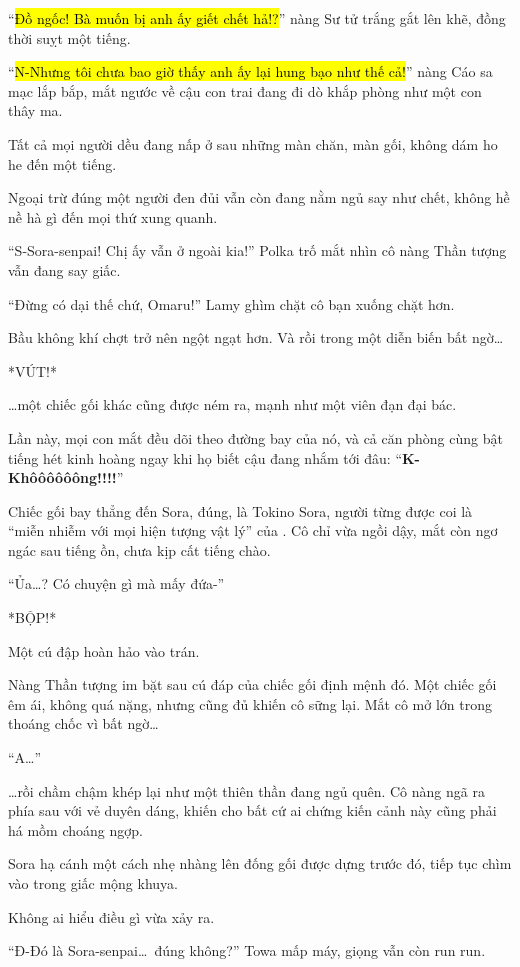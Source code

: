 \documentclass[../main.tex]{subfiles}
\begin{document}
``\hl{Đồ ngốc! Bà muốn bị anh ấy giết chết hả!?}'' nàng Sư tử trắng gắt lên khẽ, đồng thời suỵt một tiếng.

``\hl{N-Nhưng tôi chưa bao giờ thấy anh ấy lại hung bạo như thế cả!}'' nàng Cáo sa mạc lắp bắp, mắt ngước về cậu con trai đang đi dò khắp phòng như một con thây ma.

Tất cả mọi người dều đang nấp ở sau những màn chăn, màn gối, không dám ho he đến một tiếng.

Ngoại trừ đúng một người đen đủi vẫn còn đang nằm ngủ say như chết, không hề nề hà gì đến mọi thứ xung quanh.

``S-Sora-senpai! Chị ấy vẫn ở ngoài kia!'' Polka trố mắt nhìn cô nàng Thần tượng vẫn đang say giấc.

``Đừng có dại thế chứ, Omaru!'' Lamy ghìm chặt cô bạn xuống chặt hơn.

Bầu không khí chợt trở nên ngột ngạt hơn. Và rồi trong một diễn biến bất ngờ\dots

*VÚT!*

\dots một chiếc gối khác cũng được ném ra, mạnh như một viên đạn đại bác.

Lần này, mọi con mắt đều dõi theo đường bay của nó, và cả căn phòng cùng bật tiếng hét kinh hoàng ngay khi họ biết cậu đang nhắm tới đâu: ``\textbf{K-Khôôôôôông!!!!}''

Chiếc gối bay thẳng đến Sora, đúng, là Tokino Sora, người từng được coi là ``miễn nhiễm với mọi hiện tượng vật lý'' của \hll. Cô chỉ vừa ngồi dậy, mắt còn ngơ ngác sau tiếng ồn, chưa kịp cất tiếng chào.

``Ủa\dots? Có chuyện gì mà mấy đứa-''

*BỘP!*

Một cú đập hoàn hảo vào trán.

Nàng Thần tượng im bặt sau cú đáp của chiếc gối định mệnh đó. Một chiếc gối êm ái, không quá nặng, nhưng cũng đủ khiến cô sững lại. Mắt cô mở lớn trong thoáng chốc vì bất ngờ\dots

``A\dots''

\dots rồi chầm chậm khép lại như một thiên thần đang ngủ quên. Cô nàng ngã ra phía sau với vẻ duyên dáng, khiến cho bất cứ ai chứng kiến cảnh này cũng phải há mồm choáng ngợp.

Sora hạ cánh một cách nhẹ nhàng lên đống gối được dựng trước đó, tiếp tục chìm vào trong giấc mộng khuya.

Không ai hiểu điều gì vừa xảy ra.

``Đ-Đó là Sora-senpai\dots\ đúng không?'' Towa mấp máy, giọng vẫn còn run run.
\end{document}
